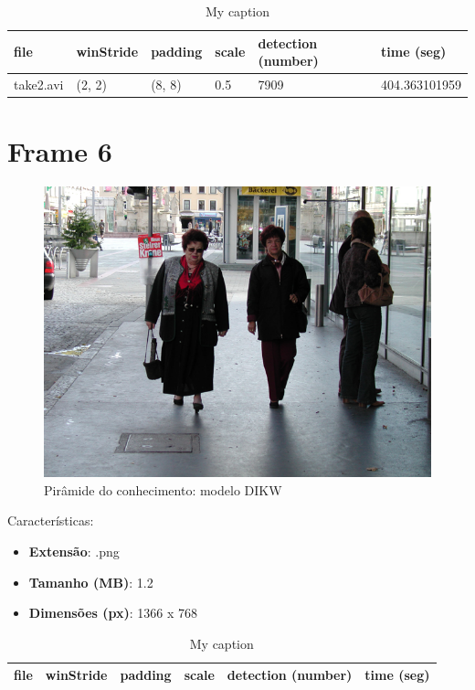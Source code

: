\begin{table}[h]
	\centering
	\begin{tabular}{|l|l|l|l|l|l|}
		\hline
		\textbf{file} & \textbf{winStride} & \textbf{padding} & \textbf{scale} & \textbf{detection (number)} & \textbf{time (seg)} \\ \hline
		take2.avi & (2, 2) & (8, 8) & 0.5 & 7909 & 404.363101959 \\ \hline
		
		
	\end{tabular}
	\caption{My caption}
	\label{my-label}
\end{table}

\section{Frame 6}


\begin{figure}[!htb]
	\centering
	\includegraphics[scale=0.25]{img/vision/frame6.png}
	\caption{Pirâmide do conhecimento: modelo DIKW}
	\label{db}
\end{figure}

Características: 
\begin{itemize}
	\item \textbf{Extensão}: .png
	\item \textbf{Tamanho (MB)}: 1.2
	\item \textbf{Dimensões (px)}: 1366 x 768
\end{itemize}

\begin{table}[h]
	\centering
	\begin{tabular}{|l|l|l|l|l|l|}
		\hline
		\textbf{file} & \textbf{winStride} & \textbf{padding} & \textbf{scale} & \textbf{detection (number)} & \textbf{time (seg)} \\ \hline


		
		
	\end{tabular}
	\caption{My caption}
	\label{my-label}
\end{table}
